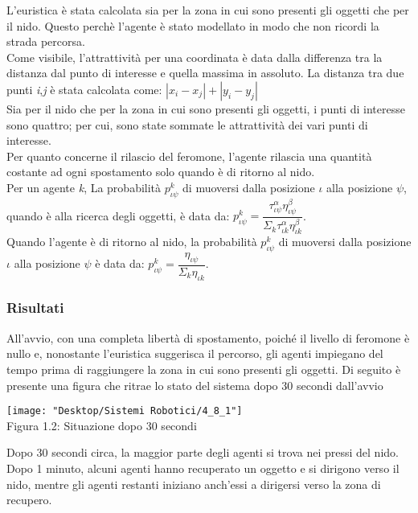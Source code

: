 \documentclass[12pt,a4paper,openright,twoside]{report}
\begin{document}
L'euristica è stata calcolata sia per la zona in cui sono presenti gli oggetti che per il nido. Questo perchè l'agente è stato modellato in modo che non ricordi la strada percorsa.\\
Come visibile, l'attrattività per una coordinata è data dalla differenza tra la distanza dal punto di interesse e quella massima in assoluto. La distanza tra due punti \textit{i},\textit{j} è stata calcolata come: $|x_i-x_j|+|y_i-y_j|$\\
Sia per il nido che per la zona in cui sono presenti gli oggetti, i punti di interesse sono quattro; per cui, sono state sommate le attrattività dei vari punti di interesse.\\
Per quanto concerne il rilascio del feromone, l'agente rilascia una quantità costante ad ogni spostamento solo quando è di ritorno al nido. \\
Per un agente \textit{k}, La probabilità $p^k_{\iota\psi}$  di muoversi dalla posizione $\iota$ alla posizione $\psi$, quando è alla ricerca degli oggetti, è data da: $p^k_{\iota\psi}= \dfrac{\tau^\alpha_{\iota\psi}\eta^\beta_{\iota\psi}}{\Sigma_k\tau^\alpha_{\iota k}\eta^\beta_{\iota k}}$. \\
Quando l'agente è di ritorno al nido, la probabilità  $p^k_{\iota\psi}$ di muoversi dalla posizione $\iota$ alla posizione $\psi$ è data da: $p^k_{\iota\psi}= \dfrac{\eta_{\iota\psi}}{\Sigma_k\eta_{\iota k}}$.

\subsubsection{Risultati}

All'avvio, con una completa libertà di spostamento, poiché il livello di feromone è nullo e, nonostante l'euristica suggerisca il percorso, gli agenti impiegano del tempo prima di raggiungere la zona in cui sono presenti gli oggetti.
Di seguito è presente una figura che ritrae lo stato del sistema dopo 30 secondi dall'avvio

\begin{center}  
	\texttt{[image: "Desktop/Sistemi Robotici/4\_8\_1"]}
	\\Figura 1.2: Situazione dopo 30 secondi
\end{center}

Dopo 30 secondi circa, la maggior parte degli agenti si trova nei pressi del nido. Dopo 1 minuto, alcuni agenti hanno recuperato un oggetto e si dirigono verso il nido, mentre gli agenti restanti iniziano anch'essi a dirigersi verso la zona di recupero.
\end{document}
